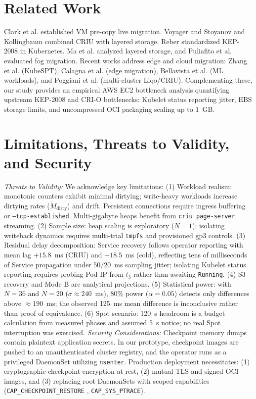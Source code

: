 \documentclass[conference,10pt]{IEEEtran}
\begin{document}
\vspace{-1.5mm}
\section{Related Work}
Clark et al. \cite{clark2005} established VM pre-copy live migration. Voyager \cite{nadgowda2017} and Stoyanov and Kollingbaum \cite{stoyanov2018} combined CRIU with layered storage. Reber \cite{reber2022} standardized KEP-2008 in Kubernetes. Ma et al. \cite{ma2019} analyzed layered storage, and Puliafito et al. \cite{puliafito2019} evaluated fog migration. Recent works address edge and cloud migration: Zhang et al. \cite{kubespt2025} (KubeSPT), Calagna et al. \cite{calagna2024} (edge migration), Bellavista et al. \cite{bellavista2024} (ML workloads), and Poggiani et al. \cite{poggiani2024} (multi-cluster Liqo/CRIU). Complementing these, our study provides an empirical AWS EC2 bottleneck analysis quantifying upstream KEP-2008 and CRI-O bottlenecks: Kubelet status reporting jitter, EBS storage limits, and uncompressed OCI packaging scaling up to 1~GB.

\vspace{-1.5mm}
\section{Limitations, Threats to Validity, and Security}
\textit{Threats to Validity:} We acknowledge key limitations: (1) Workload realism: monotonic counters exhibit minimal dirtying; write-heavy workloads increase dirtying rates ($\dot{M}_{\text{dirty}}$) and drift. Persistent connections require ingress buffering or \texttt{--tcp-established}. Multi-gigabyte heaps benefit from \texttt{criu page-server} streaming. (2) Sample size: heap scaling is exploratory ($N=1$); isolating writeback dynamics requires multi-trial \texttt{tmpfs} and provisioned gp3 controls. (3) Residual delay decomposition: Service recovery follows operator reporting with mean lag $+15.8$~ms (CRIU) and $+18.5$~ms (cold), reflecting tens of milliseconds of Service propagation under 50/20~ms sampling jitter; isolating Kubelet status reporting requires probing Pod IP from $t_3$ rather than awaiting \texttt{Running}. (4) S3 recovery and Mode B are analytical projections. (5) Statistical power: with $N = 36$ and $N = 20$ ($\sigma \approx 240$~ms), 80\% power ($\alpha = 0.05$) detects only differences above $\approx 190$~ms; the observed 125~ms mean difference is inconclusive rather than proof of equivalence. (6) Spot scenario: 120~s headroom is a budget calculation from measured phases and assumed 5~s notice; no real Spot interruption was exercised.
\textit{Security Considerations:} Checkpoint memory dumps contain plaintext application secrets. In our prototype, checkpoint images are pushed to an unauthenticated cluster registry, and the operator runs as a privileged DaemonSet utilizing \texttt{nsenter}. Production deployment necessitates: (1) cryptographic checkpoint encryption at rest, (2) mutual TLS and signed OCI images, and (3) replacing root DaemonSets with scoped capabilities (\texttt{CAP\_CHECKPOINT\_RESTORE} \cite{kernel_cap}, \texttt{CAP\_SYS\_PTRACE}).
\end{document}
